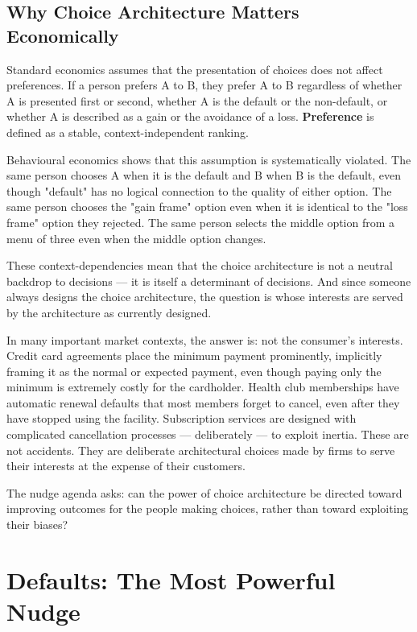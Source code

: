 \documentclass[12pt, letterpaper]{article}
\begin{document}
\subsection{Why Choice Architecture Matters Economically}


Standard economics assumes that the presentation of choices does not affect preferences. If a person prefers A to B, they prefer A to B regardless of whether A is presented first or second, whether A is the default or the non-default, or whether A is described as a gain or the avoidance of a loss. \textbf{Preference} is defined as a stable, context-independent ranking.

Behavioural economics shows that this assumption is systematically violated. The same person chooses A when it is the default and B when B is the default, even though "default" has no logical connection to the quality of either option. The same person chooses the "gain frame" option even when it is identical to the "loss frame" option they rejected. The same person selects the middle option from a menu of three even when the middle option changes.

These context-dependencies mean that the choice architecture is not a neutral backdrop to decisions --- it is itself a determinant of decisions. And since someone always designs the choice architecture, the question is whose interests are served by the architecture as currently designed.

In many important market contexts, the answer is: not the consumer's interests. Credit card agreements place the minimum payment prominently, implicitly framing it as the normal or expected payment, even though paying only the minimum is extremely costly for the cardholder. Health club memberships have automatic renewal defaults that most members forget to cancel, even after they have stopped using the facility. Subscription services are designed with complicated cancellation processes --- deliberately --- to exploit inertia. These are not accidents. They are deliberate architectural choices made by firms to serve their interests at the expense of their customers.

The nudge agenda asks: can the power of choice architecture be directed toward improving outcomes for the people making choices, rather than toward exploiting their biases?

\medskip


\section{Defaults: The Most Powerful Nudge}
\end{document}
